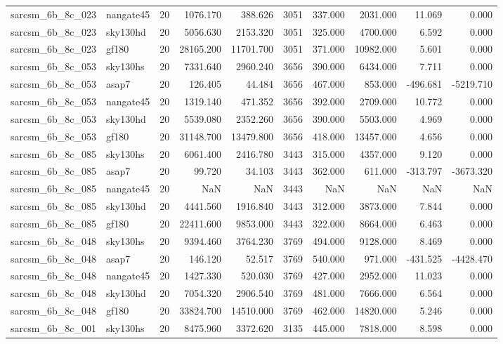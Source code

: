 \begin{longtable}{llrrrrrrrr}
sarcsm\_6b\_8c\_023 & nangate45 & 20 & 1076.170 & 388.626 & 3051 & 337.000 & 2031.000 & 11.069 & 0.000 \\
sarcsm\_6b\_8c\_023 & sky130hd & 20 & 5056.630 & 2153.320 & 3051 & 325.000 & 4700.000 & 6.592 & 0.000 \\
sarcsm\_6b\_8c\_023 & gf180 & 20 & 28165.200 & 11701.700 & 3051 & 371.000 & 10982.000 & 5.601 & 0.000 \\
sarcsm\_6b\_8c\_053 & sky130hs & 20 & 7331.640 & 2960.240 & 3656 & 390.000 & 6434.000 & 7.711 & 0.000 \\
sarcsm\_6b\_8c\_053 & asap7 & 20 & 126.405 & 44.484 & 3656 & 467.000 & 853.000 & -496.681 & -5219.710 \\
sarcsm\_6b\_8c\_053 & nangate45 & 20 & 1319.140 & 471.352 & 3656 & 392.000 & 2709.000 & 10.772 & 0.000 \\
sarcsm\_6b\_8c\_053 & sky130hd & 20 & 5539.080 & 2352.260 & 3656 & 390.000 & 5503.000 & 4.969 & 0.000 \\
sarcsm\_6b\_8c\_053 & gf180 & 20 & 31148.700 & 13479.800 & 3656 & 418.000 & 13457.000 & 4.656 & 0.000 \\
sarcsm\_6b\_8c\_085 & sky130hs & 20 & 6061.400 & 2416.780 & 3443 & 315.000 & 4357.000 & 9.120 & 0.000 \\
sarcsm\_6b\_8c\_085 & asap7 & 20 & 99.720 & 34.103 & 3443 & 362.000 & 611.000 & -313.797 & -3673.320 \\
sarcsm\_6b\_8c\_085 & nangate45 & 20 & NaN & NaN & 3443 & NaN & NaN & NaN & NaN \\
sarcsm\_6b\_8c\_085 & sky130hd & 20 & 4441.560 & 1916.840 & 3443 & 312.000 & 3873.000 & 7.844 & 0.000 \\
sarcsm\_6b\_8c\_085 & gf180 & 20 & 22411.600 & 9853.000 & 3443 & 322.000 & 8664.000 & 6.463 & 0.000 \\
sarcsm\_6b\_8c\_048 & sky130hs & 20 & 9394.460 & 3764.230 & 3769 & 494.000 & 9128.000 & 8.469 & 0.000 \\
sarcsm\_6b\_8c\_048 & asap7 & 20 & 146.120 & 52.517 & 3769 & 540.000 & 971.000 & -431.525 & -4428.470 \\
sarcsm\_6b\_8c\_048 & nangate45 & 20 & 1427.330 & 520.030 & 3769 & 427.000 & 2952.000 & 11.023 & 0.000 \\
sarcsm\_6b\_8c\_048 & sky130hd & 20 & 7054.320 & 2906.540 & 3769 & 481.000 & 7666.000 & 6.564 & 0.000 \\
sarcsm\_6b\_8c\_048 & gf180 & 20 & 33824.700 & 14510.000 & 3769 & 462.000 & 14820.000 & 5.246 & 0.000 \\
sarcsm\_6b\_8c\_001 & sky130hs & 20 & 8475.960 & 3372.620 & 3135 & 445.000 & 7818.000 & 8.598 & 0.000 \\

\end{longtable}

